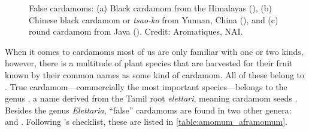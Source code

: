 \begin{figure}[!ht]
	\vspace{-2ex}
	\centering
    \hfill
    \hfill
	\caption[False cardamoms]{False cardamoms: (a) Black cardamom from the Himalayas (), (b) Chinese black cardamom or \textit{tsao-ko} from Yunnan, China (), and (c) round cardamom from Java (). Credit: Aromatiques, NAI.}
	\label{fig:black_cardamom_imgs}
\end{figure}

When it comes to cardamoms most of us are only familiar with one or two kinds, however, there is a multitude of plant species that are harvested for their fruit known by their common names as some kind of cardamom. All of these belong to . True cardamom---commercially the most important species---belongs to the genus , a name derived from the Tamil root \textit{elettari}, meaning cardamom seeds \autocite[1]{ravindran_cardamom_2002}. Besides the genus \textit{Elettaria}, ``false'' cardamoms are found in two other genera:  and . Following \textcite[290-308]{van_wyk_culinary_2014}'s checklist, these are listed in \cref{table:amomum_aframomum}.

